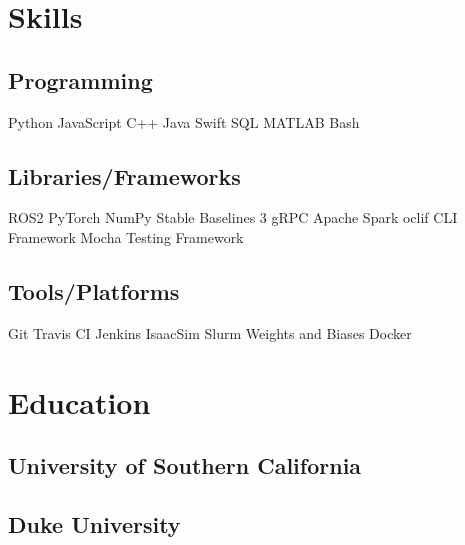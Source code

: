 \documentclass[]{plushcv}
\begin{document}
\hfill
\begin{minipage}[t]{0.25\textwidth} 


\section{Skills}
\subsection{Programming}
\sectionsep
Python \textbullet{} JavaScript \textbullet{} C++ \textbullet{} Java \textbullet{} Swift \textbullet{} SQL \textbullet{} MATLAB \textbullet{} Bash

\sectionsep
\sectionsep

\subsection{Libraries/Frameworks}
\sectionsep
ROS2 \textbullet{} PyTorch \textbullet{} NumPy \textbullet{} Stable Baselines 3 \textbullet{} gRPC \textbullet{} Apache Spark \textbullet{} oclif CLI Framework \textbullet{} Mocha Testing Framework 

\sectionsep
\sectionsep

\subsection{Tools/Platforms}
\sectionsep
Git \textbullet{} Travis CI \textbullet{} Jenkins \textbullet{}  IsaacSim \textbullet{} Slurm \textbullet{} Weights and Biases \textbullet{} Docker 


\section{Education} 
\subsection{University of Southern California}

\sectionsep
\sectionsep

\subsection{Duke University}


\end{minipage}
\end{document}
